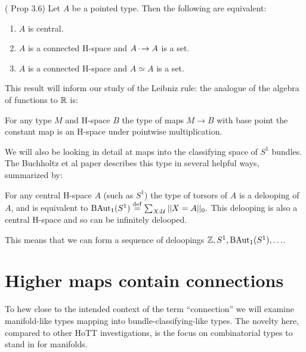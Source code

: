 \documentclass[12pt]{article}
\begin{document}
\begin{myprop}
(\cite{buchholtz2023central} Prop 3.6) Let \( A \) be a pointed type. Then the following are equivalent:
\begin{enumerate}
\item \( A \) is central.
\item \( A \) is a connected H-space and \( A\,\cdot\!\to A \) is a set.
\item \( A \) is a connected H-space and \( A\simeq A \) is a set.
\end{enumerate}
\end{myprop}

This result will inform our study of the Leibniz rule: the analogue of the algebra of functions to \( \mathbb{R} \) is:
\begin{myprop}
For any type \( M \) and H-space \( B \) the type of maps \( M\to B \) with base point the constant map is an H-space under pointwise multiplication.
\end{myprop}

We will also be looking in detail at maps into the classifying space of \( S^1 \) bundles. The Buchholtz et al paper\cite{buchholtz2023central} describes this type in several helpful ways, summarized by:

\begin{mythm}
For any central H-space \( A \) (such as \( S^1 \)) the type of torsors of \( A \) is a delooping of \( A \), and is equivalent to \( \mathrm{BAut}_1(S^1)\stackrel{\mathrm{def}}{=} \sum_{X:\mathcal{U}}||X=A||_0. \) This delooping is also a central H-space and so can be infinitely delooped.
\end{mythm}

This means that we can form a sequence of deloopings \( \mathbb{Z}, S^1, \mathrm{BAut}_1(S^1), \ldots \).

\section{Higher maps contain connections}

To hew close to the intended context of the term ``connection'' we will examine manifold-like types mapping into bundle-classifying-like types. The novelty here, compared to other HoTT investigations, is the focus on combinatorial types to stand in for manifolds.
\end{document}
